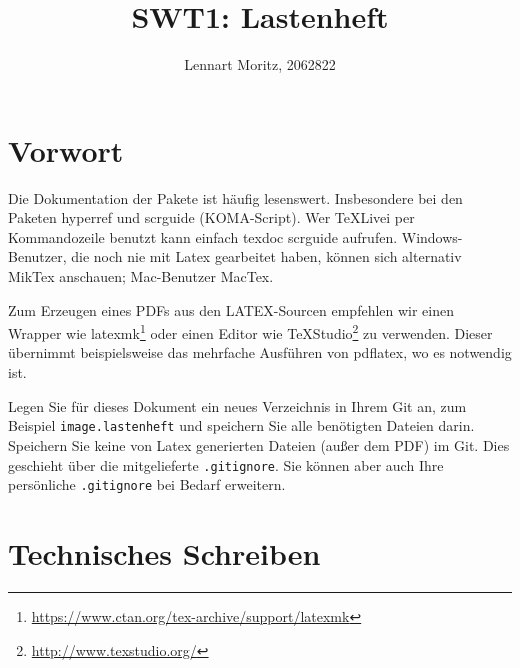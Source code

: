 \documentclass[parskip=full]{scrartcl}
\title{SWT1: Lastenheft}
\author{Lennart Moritz, 2062822}
\begin{document}
\maketitle

%
%
\section{Vorwort}
Die Dokumentation der Pakete ist häufig lesenswert.
Insbesondere bei den Paketen hyperref und scrguide (KOMA-Script).
Wer TeXLivei per Kommandozeile benutzt kann einfach texdoc scrguide aufrufen.
Windows-Benutzer, die noch nie mit Latex gearbeitet haben, können sich alternativ MikTex anschauen; Mac-Benutzer MacTex.

Zum Erzeugen eines PDFs aus den LATEX-Sourcen empfehlen wir einen Wrapper wie latexmk\footnote{\url{https://www.ctan.org/tex-archive/support/latexmk}} oder einen Editor wie TeXStudio\footnote{\url{http://www.texstudio.org/}} zu verwenden.
Dieser übernimmt beispielsweise das mehrfache Ausführen von pdflatex, wo es notwendig ist.

Legen Sie für dieses Dokument ein neues Verzeichnis in Ihrem Git an, zum Beispiel \texttt{image.lastenheft} und speichern Sie alle benötigten Dateien darin.
Speichern Sie keine von Latex generierten Dateien (außer dem PDF) im Git.
Dies geschieht über die mitgelieferte \texttt{.gitignore}.
Sie können aber auch Ihre persönliche \texttt{.gitignore} bei Bedarf erweitern.

\section{Technisches Schreiben}
\end{document}
